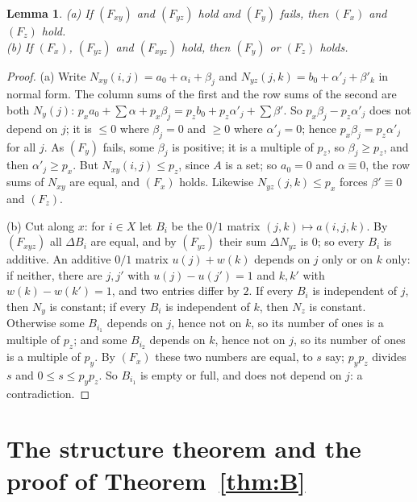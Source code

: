\documentclass[11pt,a4paper]{amsart}
\newtheorem{lemma}[theorem]{Lemma}
\theoremstyle{definition}
\theoremstyle{remark}
\begin{document}
\begin{lemma}\label{N:lem:six}
\textup{(a)} If $(F_{xy})$ and $(F_{yz})$ hold and $(F_y)$ fails, then $(F_x)$ and $(F_z)$ hold.\\
\textup{(b)} If $(F_x)$, $(F_{yz})$ and $(F_{xyz})$ hold, then $(F_y)$ or $(F_z)$ holds.
\end{lemma}
\begin{proof}
(a) Write $N_{xy}(i,j)=a_0+\alpha_i+\beta_j$ and $N_{yz}(j,k)=b_0+\alpha'_j+\beta'_k$ in normal form. The column
sums of the first and the row sums of the second are both $N_y(j)$:
$p_xa_0+\sum\alpha+p_x\beta_j=p_zb_0+p_z\alpha'_j+\sum\beta'$. So $p_x\beta_j-p_z\alpha'_j$ does not depend on $j$;
it is $\le 0$ where $\beta_j=0$ and $\ge 0$ where $\alpha'_j=0$; hence $p_x\beta_j=p_z\alpha'_j$ for all $j$. As
$(F_y)$ fails, some $\beta_j$ is positive; it is a multiple of $p_z$, so $\beta_j\ge p_z$, and then
$\alpha'_j\ge p_x$. But $N_{xy}(i,j)\le p_z$, since $A$ is a set; so $a_0=0$ and $\alpha\equiv0$, the row sums of
$N_{xy}$ are equal, and $(F_x)$ holds. Likewise $N_{yz}(j,k)\le p_x$ forces $\beta'\equiv 0$ and $(F_z)$.

(b) Cut along $x$: for $i\in X$ let $B_i$ be the $0/1$ matrix $(j,k)\mapsto a(i,j,k)$. By $(F_{xyz})$ all
$\Delta B_i$ are equal, and by $(F_{yz})$ their sum $\Delta N_{yz}$ is $0$; so every $B_i$ is additive. An
additive $0/1$ matrix $u(j)+w(k)$ depends on $j$ only or on $k$ only: if neither, there are $j,j'$ with
$u(j)-u(j')=1$ and $k,k'$ with $w(k)-w(k')=1$, and two entries differ by $2$. If every $B_i$ is independent of
$j$, then $N_y$ is constant; if every $B_i$ is independent of $k$, then $N_z$ is constant. Otherwise some $B_{i_1}$
depends on $j$, hence not on $k$, so its number of ones is a multiple of $p_z$; and some $B_{i_2}$ depends on $k$,
hence not on $j$, so its number of ones is a multiple of $p_y$. By $(F_x)$ these two numbers are equal, to $s$
say; $p_yp_z$ divides $s$ and $0\le s\le p_yp_z$. So $B_{i_1}$ is empty or full, and does not depend on $j$: a
contradiction.
\end{proof}

\section{The structure theorem and the proof of Theorem~\ref{thm:B}}\label{N:sec:proof}
\end{document}
